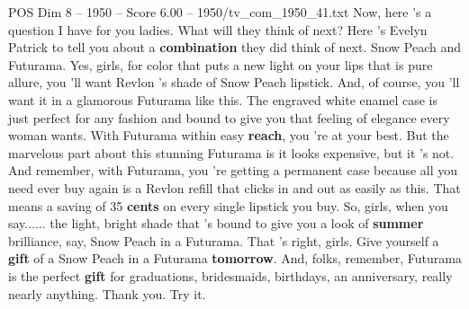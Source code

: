 \begin{textsample}{POS Dim 8 – 1950 – Score 6.00 – 1950/tv\_com\_1950\_41.txt}  \label{ex:f8_pos_001}
Now, here 's a question I have for you ladies.
What will they think of next?
Here 's Evelyn Patrick to tell you about a \textbf{combination} they did think of next.
Snow Peach and Futurama.
Yes, girls, for color that puts a new light on your lips that is pure allure, you 'll want Revlon 's shade of Snow Peach lipstick.
And, of course, you 'll want it in a glamorous Futurama like this.
The engraved white enamel case is just perfect for any fashion and bound to give you that feeling of elegance every woman wants.
With Futurama within easy \textbf{reach}, you 're at your best.
But the marvelous part about this stunning Futurama is it looks expensive, but it 's not.
And remember, with Futurama, you 're getting a permanent case because all you need ever buy again is a Revlon refill that clicks in and out as easily as this.
That means a saving of 35 \textbf{cents} on every single lipstick you buy.
So, girls, when you say...... the light, bright shade that 's bound to give you a look of \textbf{summer} brilliance, say, Snow Peach in a Futurama.
That 's right, girls.
Give yourself a \textbf{gift} of a Snow Peach in a Futurama \textbf{tomorrow}.
And, folks, remember, Futurama is the perfect \textbf{gift} for graduations, bridesmaids, birthdays, an anniversary, really nearly anything.
Thank you.
Try it.

\end{textsample}
